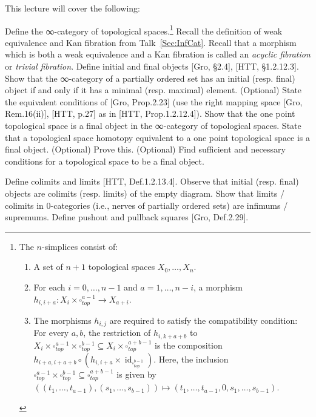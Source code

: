 \documentclass[a4paper]{amsart}
\numberwithin{figure}{section}
\theoremstyle{theorem}
\theoremstyle{definition}
\DeclareMathOperator{\id}{id}
\begin{document}
This lecture will cover the following:

Define the ∞-category of topological spaces.\footnote{%
The $n$-simplices consist of:
\begin{enumerate}
 \item A set of $n{+}1$ topological spaces $X_0, \dots, X_n$.

 \item For each $i = 0, \dots, n{-}1$ and $a = 1, \dots, n{-}i$, a morphism $h_{i,i{+}a}: X_i {\times} \square^{a{-}1}_{top} \to X_{a{+}i}$.%

 \item The morphisms $h_{i,j}$ are required to satisfy the compatibility condition: For every $a, b$, the restriction of $h_{i,k{+}a{+}b}$ to $X_i{\times}\square^{a{-}1}_{top} {\times} \square^{b{-}1}_{top} \subseteq X_{i}{\times}\square^{a{+}b{-}1}_{top}$ is the composition $h_{i{+}a,i{+}a{+}b} \circ (h_{i,i{+}a} \times \id_{\square^{b{-}1}_{top}})$. Here, the inclusion $\square^{a{-}1}_{top} {\times} \square^{b{-}1}_{top} \subseteq \square^{a{+}b{-}1}_{top}$ is given by $((t_1, \dots, t_{a-1}), (s_1, \dots, s_{b-1})) \mapsto (t_1, \dots, t_{a-1}, 0, s_1, \dots, s_{b-1})$.
\end{enumerate}
} %
Recall the definition of weak equivalence and Kan fibration from Talk~\ref{Sec:InfCat}. %
Recall that a morphism which is both a weak equivalence and a Kan fibration is called an \emph{acyclic fibration} or \emph{trivial fibration}. %
Define initial and final objects [Gro, §2.4], [HTT, §1.2.12.3]. %
Show that the ∞-category of a partially ordered set has an initial (resp. final) object if and only if it has a minimal (resp. maximal) element. %
(Optional) State the equivalent conditions of [Gro, Prop.2.23] (use the right mapping space [Gro, Rem.16(ii)], [HTT, p.27] as in [HTT, Prop.1.2.12.4]). %
Show that the one point topological space is a final object in the ∞-category of topological spaces. %
State that a topological space homotopy equivalent to a one point topological space is a final object. %
(Optional) Prove this. %
(Optional) Find sufficient and necessary conditions for a topological space to be a final object. %

Define colimits and limits [HTT, Def.1.2.13.4]. %
Observe that initial (resp. final) objects are colimits (resp. limits) of the empty diagram. %
Show that limits / colimits in 0-categories (i.e., nerves of partially ordered sets) are infimums / supremums. %
Define pushout and pullback squares [Gro, Def.2.29]. %
\end{document}
